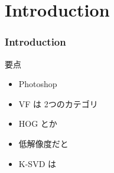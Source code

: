 \section{Introduction}
\begin{frame}\frametitle{Introduction}
要点
\begin{itemize}
    \item Photoshop ~
    \item VF は 2つのカテゴリ
    \item HOG とか ~
    \item 低解像度だと ~
    \item K-SVD は ~
\end{itemize}
\end{frame}
